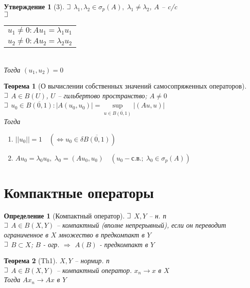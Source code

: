 \documentclass{article}
\theoremstyle{truestyle}
\newtheorem*{defenition}{Определение}
\newtheorem*{theorem}{Теорема}
\newtheorem*{utv}{Утверждение}
\def\letus{%
	\mathord{\setbox0=\hbox{$\exists$}%
		\hbox{\kern 0.125\wd0%
			\vbox to \ht0{%
				\hrule width 0.75\wd0%
				\vfill%
				\hrule width 0.75\wd0}%
			\vrule height \ht0%
			\kern 0.125\wd0}%
	}%
}
\begin{document}
\begin{utv}[3]
  $\letus$ $\lambda_1, \lambda_2 \in \sigma_p(A), \; \lambda_1 \neq \lambda_2$, $A$ -- c/c\\
  $\letus$
  \begin{tabular}[t]{c}
  $u_1 \neq 0: Au_1 = \lambda_1 u_1$\\
  $u_2 \neq 0: Au_2 = \lambda_2 u_2$
  \end{tabular}
  \\
  Тогда $(u_1, u_2) = 0$
\end{utv}

\begin{theorem}[О вычислении собственных значений самосопряженных операторов]
  $\letus$ $A \in B(U)$, $U$ -- гильбертово пространство; $A \neq 0$\\
  $\letus$ $u_0 \in \overline{B(0, 1)}: |A(u_0, u_0)| = \sup\limits_{u\in \overline{B(0, 1)}}|(Au, u)|$\\
  Тогда\begin{minipage}[t]{0.8\linewidth}\begin{enumerate}[itemsep=1mm]
      \item $||u_0|| = 1 \quad (\Leftrightarrow u_0 \in \delta \overline{B(0, 1)})$
      \item $Au_0 = \lambda_0u_0, \; \lambda_0 = (Au_0, u_0) \quad (u_0 - \text{с.в.}; \; \lambda_0 \in \sigma_p(A))$
    \end{enumerate}\end{minipage}
\end{theorem}

\section*{Компактные операторы}

\begin{defenition}[Компактный оператор]
  $\letus$ $X, Y$ -- н. п\\ $\letus$ $A \in B(X, Y)$ -- компактный (вполне непрерывный), если он переводит ограниченное в $X$ множество
  в предкомпакт в $Y$\\
  $\letus$ $B \subset X$; $B$ - огр. $\Rightarrow$ $A(B)$ - предкомпакт в $Y$
\end{defenition}

\begin{theorem}[Th1]
  $X, Y$ -- нормир. п\\
  $\letus$ $A \in B(X, Y)$ -- компактный оператор. $x_n \longrightarrow x$ в $X$\\
  Тогда $Ax_n \longrightarrow Ax$ в $Y$
\end{theorem}
\end{document}
